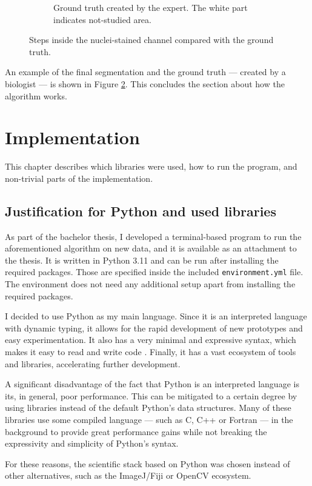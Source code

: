\documentclass[
  digital,     %
  oneside,     %
  nosansbold,  %
  nocolorbold, %
  lof,         %
  lot,         %
]{fithesis4}
\begin{document}
\begin{figure}
\begin{subfigure}[t]{0.45\textwidth}
        \caption{Ground truth created by the expert. The white part indicates
        not-studied area.}
        \label{fig:ground-truth-crop}
    \end{subfigure}
    \caption{Steps inside the nuclei-stained channel compared with the ground
    truth.}
\end{figure}

An example of the final segmentation and the ground truth --- created by a
biologist --- is shown in Figure \ref{fig:ground-truth-crop}. This concludes the
section about how the algorithm works.

\chapter{Implementation}
\label{chp:implementation}
This chapter describes which libraries were used, how to run the program, and
non-trivial parts of the implementation.

\section{Justification for Python and used libraries}
As part of the bachelor thesis, I developed a terminal-based program to run the
aforementioned algorithm on new data, and it is available as an attachment to the
thesis. It is written in Python 3.11 and can be run after installing the
required packages. Those are specified inside the included
\texttt{environment.yml} file. The environment does not need any additional setup
apart from installing the required packages.

I decided to use Python as my main language. Since it is an interpreted language
with dynamic typing, it allows for the rapid development of new prototypes and easy
experimentation. It also has a very minimal and expressive syntax, which makes
it easy to read and write code \cite{python-docs-tutorial}. Finally, it has a
vast ecosystem of tools and libraries, accelerating further development. 

A significant disadvantage of the fact that Python is an interpreted language
is its, in general, poor performance. This can be mitigated to a certain degree
by using libraries instead of the default Python's data structures. Many of
these libraries use some compiled language --- such as C, C++ or Fortran --- in
the background to provide great performance gains while not breaking
the expressivity and simplicity of Python's syntax.

For these reasons, the scientific stack based on Python was chosen instead of
other alternatives, such as the ImageJ/Fiji or OpenCV ecosystem.
\end{document}
